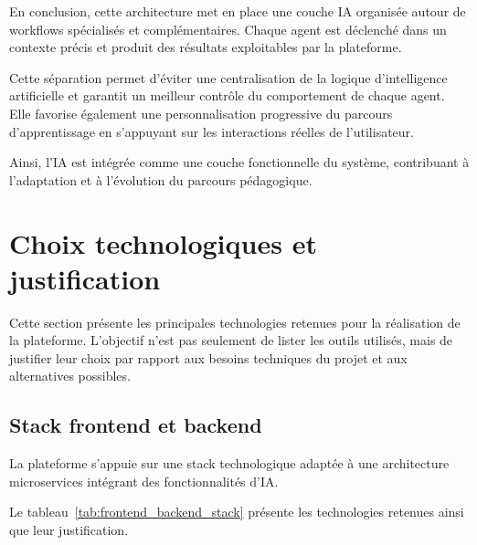 En conclusion, cette architecture met en place une couche IA organisée autour de workflows spécialisés et complémentaires. Chaque agent est déclenché dans un contexte précis et produit des résultats exploitables par la plateforme.

Cette séparation permet d'éviter une centralisation de la logique d'intelligence artificielle et garantit un meilleur contrôle du comportement de chaque agent. Elle favorise également une personnalisation progressive du parcours d'apprentissage en s'appuyant sur les interactions réelles de l'utilisateur.

Ainsi, l'IA est intégrée comme une couche fonctionnelle du système, contribuant à l'adaptation et à l'évolution du parcours pédagogique.

\section{Choix technologiques et justification}

Cette section présente les principales technologies retenues pour la réalisation de la plateforme.
L'objectif n'est pas seulement de lister les outils utilisés, mais de justifier leur choix par rapport
aux besoins techniques du projet et aux alternatives possibles.

\subsection{Stack frontend et backend}

La plateforme s'appuie sur une stack technologique adaptée à une architecture microservices intégrant des fonctionnalités d'IA.

Le tableau~\ref{tab:frontend_backend_stack} présente les technologies retenues ainsi que leur justification.


